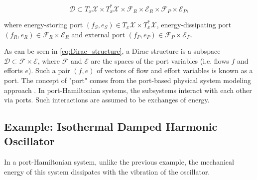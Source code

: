 \documentclass[
	parskip, 			   %
	twoside, 			   %
	DIV=14, 			   %
	BCOR=15.0mm, 		   %
	headsepline, 		   %
	open=right, 		   %
	captions=tableheading, %
	bibliography=totoc,    %
	numbers=noenddot       %
]{scrreprt}
\begin{document}
\begin{equation}
    \label{eq:Dirac_structure}
    \mathcal{D} \subset T_{x}\mathcal{X} \times T_{x}^{*}\mathcal{X} \times \mathcal{F}_R \times \mathcal{E}_R \times \mathcal{F}_P \times \mathcal{E}_P,
\end{equation}

where energy-storing port $(f_S, e_S) \in T_{x}\mathcal{X} \times T_{x}^{*}\mathcal{X}$, energy-dissipating port $(f_R, e_R) \in \mathcal{F}_R \times \mathcal{E}_R$ and external port $(f_P, e_P) \in \mathcal{F}_P \times \mathcal{E}_P$.

As can be seen in \ref{eq:Dirac_structure}, a Dirac structure is a subspace $\mathcal{D} \subset \mathcal{F} \times \mathcal{E}$, where $\mathcal{F}$ and $\mathcal{E}$ are the spaces of the port variables (i.e. flows $f$ and efforts $e$). Such a pair $(f,e)$ of vectors of flow and effort variables is known as a port. The concept of "port" comes from the port-based physical system modeling approach \cite{duindam2009modeling}. In port-Hamiltonian systems, the subsystems interact with each other via ports. Such interactions are assumed to be exchanges of energy.

\subsection{Example: Isothermal Damped Harmonic Oscillator}
In a port-Hamiltonian system, unlike the previous example, the mechanical energy of this system dissipates with the vibration of the oscillator.
\end{document}
